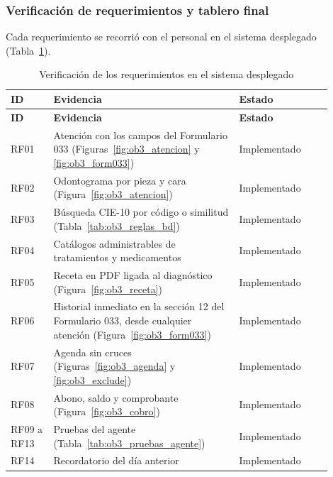 
\subsubsection{Verificación de requerimientos y tablero final}

Cada requerimiento se recorrió con el personal en el sistema desplegado (Tabla~\ref{tab:ob3_verificacion}).

\begingroup
\fontsize{9}{11}\selectfont
\renewcommand{\arraystretch}{1.2}
\setlength{\LTpre}{0pt}\setlength{\LTpost}{6pt}
\setlength{\tabcolsep}{4pt}
\begin{longtable}{|p{0.12\linewidth}|p{0.52\linewidth}|p{0.26\linewidth}|}
\caption{Verificación de los requerimientos en el sistema desplegado}
\label{tab:ob3_verificacion} \\
\hline
\textbf{ID} & \textbf{Evidencia} & \textbf{Estado} \\ \hline
\endfirsthead
\hline
\textbf{ID} & \textbf{Evidencia} & \textbf{Estado} \\ \hline
\endhead
RF01 & Atención con los campos del Formulario 033 (Figuras~\ref{fig:ob3_atencion} y \ref{fig:ob3_form033}) & Implementado \\ \hline
RF02 & Odontograma por pieza y cara (Figura~\ref{fig:ob3_atencion}) & Implementado \\ \hline
RF03 & Búsqueda CIE-10 por código o similitud (Tabla~\ref{tab:ob3_reglas_bd}) & Implementado \\ \hline
RF04 & Catálogos administrables de tratamientos y medicamentos & Implementado \\ \hline
RF05 & Receta en PDF ligada al diagnóstico (Figura~\ref{fig:ob3_receta}) & Implementado \\ \hline
RF06 & Historial inmediato en la sección 12 del Formulario 033, desde cualquier atención (Figura~\ref{fig:ob3_form033}) & Implementado \\ \hline
RF07 & Agenda sin cruces (Figuras~\ref{fig:ob3_agenda} y \ref{fig:ob3_exclude}) & Implementado \\ \hline
RF08 & Abono, saldo y comprobante (Figura~\ref{fig:ob3_cobro}) & Implementado \\ \hline
RF09 a RF13 & Pruebas del agente (Tabla~\ref{tab:ob3_pruebas_agente}) & Implementado \\ \hline
RF14 & Recordatorio del día anterior & Implementado \\ \hline

\end{longtable}
